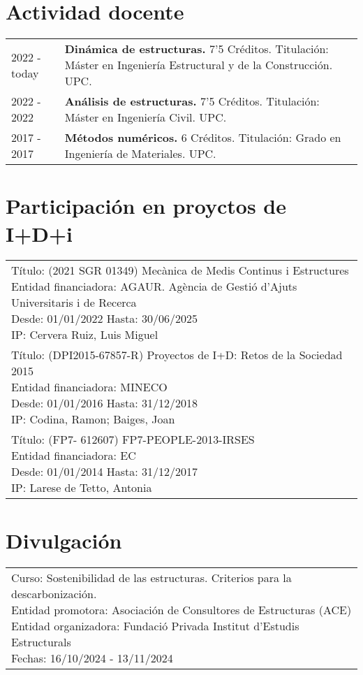\documentclass[12pt]{article}
\begin{document}
\section{Actividad docente}
\begin{tabularx}{\linewidth}{lX}
    2022 - today &
    \textbf{Dinámica de estructuras.} 7'5 Créditos. Titulación: Máster en Ingeniería Estructural y de la Construcción. UPC. \\

    2022 - 2022 &
    \textbf{Análisis de estructuras.} 7'5 Créditos. Titulación: Máster en Ingeniería Civil. UPC. \\

    2017 - 2017 &
    \textbf{Métodos numéricos.} 6 Créditos. Titulación: Grado en Ingeniería de Materiales. UPC. \\
\end{tabularx}


\section{Participación en proyctos de I+D+i}
\begin{tabularx}{\linewidth}{l}
    \parbox{\linewidth}{
        Título: (2021 SGR 01349) Mecànica de Medis Continus i Estructures \\
        Entidad financiadora: AGAUR. Agència de Gestió d'Ajuts Universitaris i de Recerca \\
        Desde: 01/01/2022 Hasta: 30/06/2025 \\
        IP: Cervera Ruiz, Luis Miguel
    } \\ [2.5em]

    \parbox{\linewidth}{
        Título: (DPI2015-67857-R) Proyectos de I+D: Retos de la Sociedad 2015 \\
        Entidad financiadora: MINECO \\
        Desde: 01/01/2016 Hasta: 31/12/2018 \\
        IP: Codina, Ramon; Baiges, Joan
    } \\ [2.5em]

    \parbox{\linewidth}{
        Título: (FP7- 612607) FP7-PEOPLE-2013-IRSES \\
        Entidad financiadora: EC \\
        Desde: 01/01/2014 Hasta: 31/12/2017 \\
        IP: Larese de Tetto, Antonia
    }
\end{tabularx}


\section{Divulgación}
\begin{tabularx}{\linewidth}{l}
    \parbox{\linewidth}{
        Curso: Sostenibilidad de las estructuras. Criterios para la descarbonización. \\
        Entidad promotora: Asociación de Consultores de Estructuras (ACE) \\
        Entidad organizadora: Fundació Privada Institut d'Estudis Estructurals \\
        Fechas: 16/10/2024 - 13/11/2024
    }
\end{tabularx}
\end{document}
